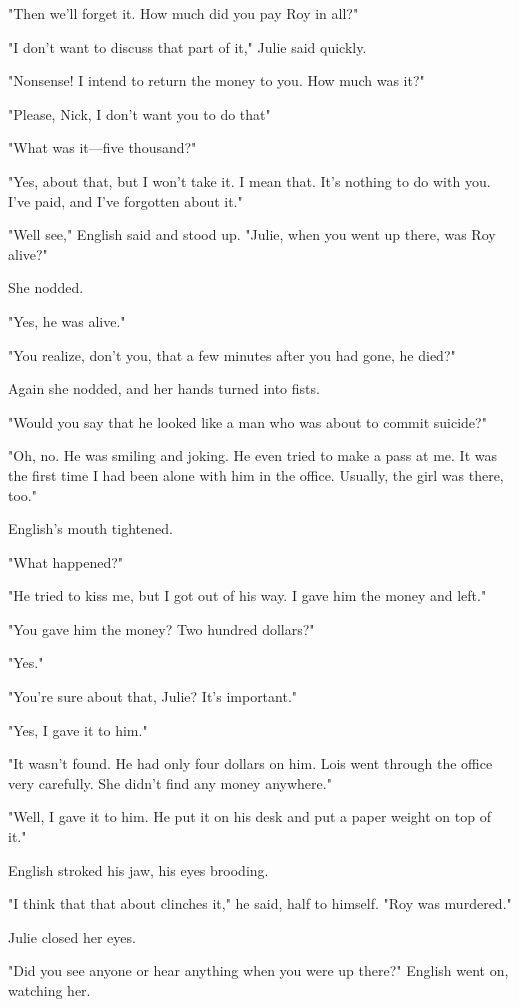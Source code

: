 \documentclass{novel}
\begin{document}
"Then we'll forget it. How much did you pay Roy in all?"

"I don't want to discuss that part of it," Julie said quickly.

"Nonsense! I intend to return the money to you. How much was it?"

"Please, Nick, I don't want you to do that"

"What was it—five thousand?"

"Yes, about that, but I won't take it. I mean that. It's nothing to do with you. I've paid, and I've forgotten about it."

"Well see," English said and stood up. "Julie, when you went up there, was Roy alive?"

She nodded.

"Yes, he was alive."

"You realize, don't you, that a few minutes after you had gone, he died?"

Again she nodded, and her hands turned into fists.

"Would you say that he looked like a man who was about to commit suicide?"

"Oh, no. He was smiling and joking. He even tried to make a pass at me. It was the first time I had been alone with him in the office. Usually, the girl was there, too."

English's mouth tightened.

"What happened?"

"He tried to kiss me, but I got out of his way. I gave him the money and left."

"You gave him the money? Two hundred dollars?"

"Yes."

"You're sure about that, Julie? It's important."

"Yes, I gave it to him."

"It wasn't found. He had only four dollars on him. Lois went through the office very carefully. She didn't find any money anywhere."

"Well, I gave it to him. He put it on his desk and put a paper weight on top of it."

English stroked his jaw, his eyes brooding.

"I think that that about clinches it," he said, half to himself. "Roy was murdered."

Julie closed her eyes.

"Did you see anyone or hear anything when you were up there?" English went on, watching her.
\end{document}
